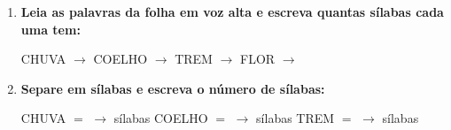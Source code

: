 \begin{exercicio}
\begin{enumerate}[resume]
  \item \textbf{Leia as palavras da folha em voz alta e escreva quantas sílabas cada uma tem:}

  \begin{center}
  CHUVA $\rightarrow$ \underline{\hspace{1cm}} \quad COELHO $\rightarrow$ \underline{\hspace{1cm}} \quad TREM $\rightarrow$ \underline{\hspace{1cm}} \quad FLOR $\rightarrow$ \underline{\hspace{1cm}}
  \end{center}

  \item \textbf{Separe em sílabas e escreva o número de sílabas:}
  \begin{center}
  CHUVA $=$ \underline{\hspace{1.2cm}} $\rightarrow$ \underline{\hspace{0.8cm}} sílabas \quad COELHO $=$ \underline{\hspace{1.2cm}} $\rightarrow$ \underline{\hspace{0.8cm}} sílabas \quad TREM $=$ \underline{\hspace{1.2cm}} $\rightarrow$ \underline{\hspace{0.8cm}} sílabas
  \end{center}

\end{enumerate}

\end{exercicio}



